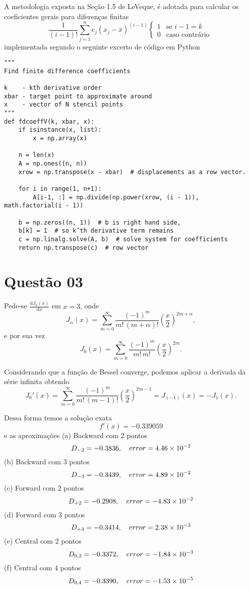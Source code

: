 \documentclass{article}
\begin{document}
A metodologia exposta na Seção 1.5 de LeVeque\cite{leveque}, é adotada para calcular os coeficientes gerais para diferenças finitas
\begin{equation*}
\frac{1}{(i-1)!}\sum_{j=1}^n c_j(x_j-\bar{x})^{(i-1)}\begin{cases}
			1 &\text{se $i-1 = k$} \\
                        0 &\text{caso contrário}\
                    \end{cases}
\end{equation*}
implementada segundo o seguinte excerto de código em Python
\begin{lstlisting}
"""
Find finite difference coefficients

k    - kth derivative order
xbar - target point to approximate around
x    - vector of N stencil points
"""
def fdcoeffV(k, xbar, x):
    if isinstance(x, list):
        x = np.array(x)

    n = len(x)
    A = np.ones((n, n))
    xrow = np.transpose(x - xbar)  # displacements as a row vector.

    for i in range(1, n+1):
        A[i-1, :] = np.divide(np.power(xrow, (i - 1)), math.factorial(i - 1))

    b = np.zeros((n, 1))  # b is right hand side,
    b[k] = 1  # so k’th derivative term remains
    c = np.linalg.solve(A, b)  # solve system for coefficients
    return np.transpose(c)  # row vector

\end{lstlisting}

\section{Questão 03}

Pede-se $\frac{\mathrm{d}J_0(x)}{\mathrm{d}x}$ em $x=3$, onde 
\[J_\alpha(x) = \sum_{m=0}^\infty \frac{(-1)^m}{m!\, (m+\alpha)!} {\left(\frac{x}{2}\right)}^{2m+\alpha},\]
e por sua vez
\[J_0(x) = \sum_{m=0}^\infty \frac{(-1)^m}{m!\, m!} {\left(\frac{x}{2}\right)}^{2m}.\]

Considerando que a função de Bessel converge, podemos aplicar a derivada da série infinita obtendo
\[J_0'(x) = \sum_{m=0}^\infty \frac{(-1)^m}{m!\, (m-1)!} {\left(\frac{x}{2}\right)}^{2m-1} = J_{(-1)}(x) = -J_1(x).\]

Dessa forma temos a solução exata
\[
 f'(x) = -0.339059
 \]
 e as aproximações
(a) Backward com 2 pontos
\[D_{-2} = -0.3836, \quad error = \num{4.46E-02} \]
(b) Backward com 3 pontos
\[D_{-3} = -0.3439, \quad error = \num{4.89E-02} \]
(c) Forward com 2 pontos
\[D_{+2} = -0.2908, \quad error = \num{-4.83E-02} \]
(d) Forward com 3 pontos
\[D_{+3} = -0.3414, \quad error = \num{2.38E-03} \]
(e) Central com 2 pontos
\[D_{0, 2} = -0.3372, \quad error = \num{-1.84E-03} \]
(f) Central com 4 pontos
\[D_{0, 4} = -0.3390, \quad error = \num{-1.53E-05} \]
\end{document}
